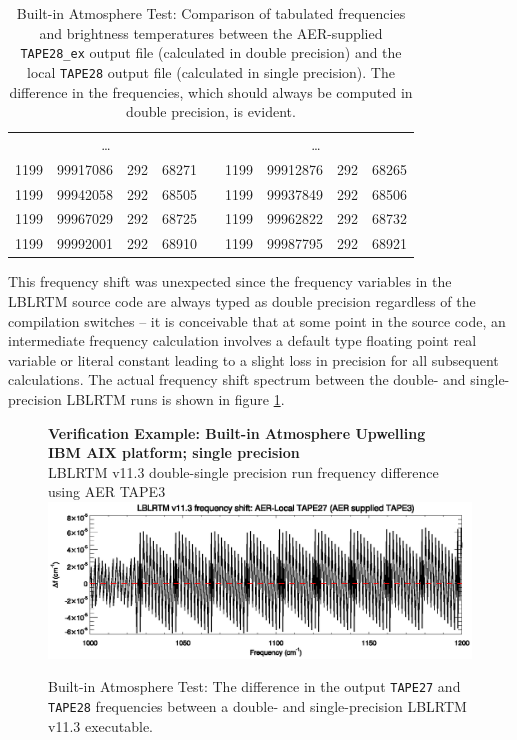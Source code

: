 \begin{table}[htp]
\begin{tabular}{r@{.}l r@{.}l c r@{.}l r@{.}l}
     \multicolumn{4}{c}{\ldots} & & \multicolumn{4}{c}{\ldots}\\
     1199&99917086 & 292&68271 & \hspace{1.0cm} & 1199&99912876 & 292&68265 \\ 
     1199&99942058 & 292&68505 & \hspace{1.0cm} & 1199&99937849 & 292&68506 \\ 
     1199&99967029 & 292&68725 & \hspace{1.0cm} & 1199&99962822 & 292&68732 \\ 
     1199&99992001 & 292&68910 & \hspace{1.0cm} & 1199&99987795 & 292&68921 \\ 
    \hline
  \end{tabular}
  \caption{Built-in Atmosphere Test: Comparison of tabulated frequencies and brightness temperatures between the AER-supplied \texttt{TAPE28\_ex} output file (calculated in double precision) and the local \texttt{TAPE28} output file (calculated in single precision). The difference in the frequencies, which should always be computed in double precision, is evident.}
  \label{tab:tape28_frequency_comparison-sgl}
\end{table}

This frequency shift was unexpected  since the frequency variables in the LBLRTM source code are always typed as double precision regardless of the compilation switches -- it is conceivable that at some point in the source code, an intermediate frequency calculation involves a default type floating point real variable or literal constant leading to a slight loss in precision for all subsequent calculations. The actual frequency shift spectrum between the double- and single-precision LBLRTM runs is shown in figure \ref{fig:run_example_built_in_atm_upwelling-dbl-sgl_df}.

\begin{figure}[htp]
  \centering
  \qquad\sffamily\textbf{Verification Example: Built-in Atmosphere Upwelling}\\
  \qquad\sffamily\textbf{IBM AIX platform; single precision}\\
  \qquad\textsf{LBLRTM v11.3 double-single precision run frequency difference using AER TAPE3}\\
  \includegraphics[bb=80 403 534 558,clip,scale=1.0]{graphics/run_example_built_in_atm_upwelling/dbl-sgl_df.eps}
  \caption{Built-in Atmosphere Test: The difference in the output \texttt{TAPE27} and \texttt{TAPE28} frequencies between a double- and single-precision LBLRTM v11.3 executable.}
  \label{fig:run_example_built_in_atm_upwelling-dbl-sgl_df}
\end{figure}


